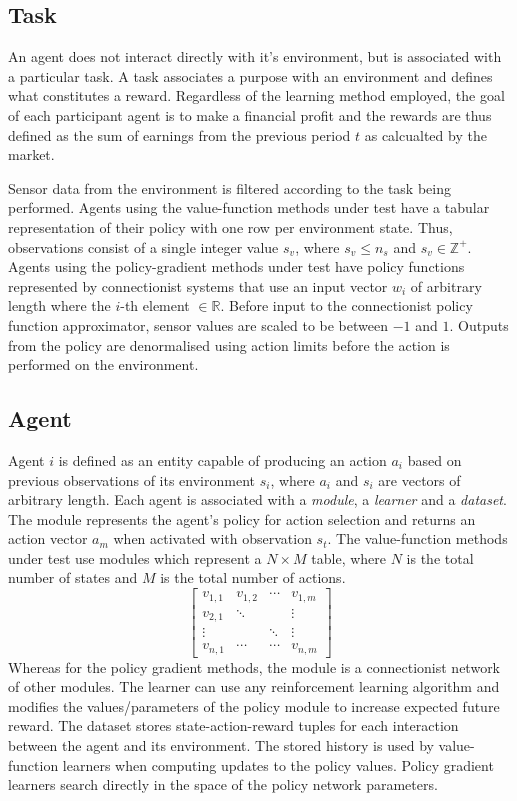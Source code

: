 \subsection{Task}
An agent does not interact directly with it's environment, but is associated
with a particular task.  A task associates a purpose with an environment and
defines what constitutes a reward.  Regardless of the learning method employed,
the goal of each participant agent is to make a financial profit and the
rewards are thus defined as the sum of earnings from the previous period $t$
as calcualted by the market.

Sensor data from the environment is filtered according to the task being
performed.  Agents using the value-function methods under test have a tabular
representation of their policy with one row per environment state.  Thus,
observations consist of a single integer value $s_v$, where $s_v \leq n_s$ and
$s_v \in \mathbb{Z}^+$.  Agents using the policy-gradient methods under test
have policy functions represented by connectionist systems that use an input
vector $w_i$ of arbitrary length where the $i$-th element $\in \mathbb{R}$.
Before input to the connectionist policy function approximator, sensor values
are scaled to be between $-1$ and $1$. Outputs from the policy are
denormalised using action limits before the action is performed on the
environment.

\subsection{Agent}
Agent $i$ is defined as an entity capable of producing an action $a_i$
based on previous observations of its environment $s_i$, where $a_i$ and $s_i$
are vectors of arbitrary length.  Each agent is associated with a
\textit{module}, a \textit{learner} and a \textit{dataset}. The module
represents the agent's policy for action selection and returns an action
vector $a_m$ when activated with observation $s_t$.  The value-function
methods under test use modules which represent a $N \times M$ table, where $N$
is the total number of states and $M$ is the total number of actions.
\begin{equation}
\begin{bmatrix}
v_{1,1}& v_{1,2}& \dotsb& v_{1,m}\\
v_{2,1}& \ddots& & \vdots\\
\vdots& &\ddots& \vdots\\
v_{n,1}& \dotsb& \dotsb& v_{n,m}
\end{bmatrix}
\end{equation}
Whereas for the policy gradient methods, the module is a connectionist network
of other modules.  The learner can use any
reinforcement learning algorithm and modifies the values/parameters of the
policy module to increase expected future reward.  The dataset stores
state-action-reward tuples for each interaction between the agent and its
environment.  The stored history is used by value-function learners when
computing updates to the policy values.  Policy gradient learners search
directly in the space of the policy network parameters.

